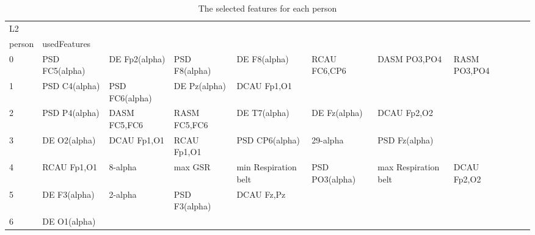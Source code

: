 \begin{landscape}
\begin{table}[]
\centering
\caption{The selected features for each person}
\begin{tabular}{l|llllllll}
L2       &                       &                       &                      &                         &                         &                      &                      &                       &                       &                    \\
person   & usedFeatures          &                       &                      &                         &                         &                      &                      &                       &                       &                    \\
0        & PSD FC5(alpha)        & DE Fp2(alpha)         & PSD F8(alpha)        & DE F8(alpha)            & RCAU FC6,CP6            & DASM PO3,PO4         & RASM PO3,PO4         &                       &                       &                    \\
1        & PSD C4(alpha)         & PSD FC6(alpha)        & DE Pz(alpha)         & DCAU Fp1,O1             &                         &                      &                      &                       &                       &                    \\
2        & PSD P4(alpha)         & DASM FC5,FC6          & RASM FC5,FC6         & DE T7(alpha)            & DE Fz(alpha)            & DCAU Fp2,O2          &                      &                       &                       &                    \\
3        & DE O2(alpha)          & DCAU Fp1,O1           & RCAU Fp1,O1          & PSD CP6(alpha)          & 29-alpha                & PSD Fz(alpha)        &                      &                       &                       &                    \\
4        & RCAU Fp1,O1           & 8-alpha               & max GSR              & min Respiration belt    & PSD PO3(alpha)          & max Respiration belt & DCAU Fp2,O2          &                       &                       &                    \\
5        & DE F3(alpha)          & 2-alpha               & PSD F3(alpha)        & DCAU Fz,Pz              &                         &                      &                      &                       &                       &                    \\
6        & DE O1(alpha)          &                       &                      &                         &                         &                      &                      &                       &                       &                    \\

\end{tabular}
\end{table}
\end{landscape}
